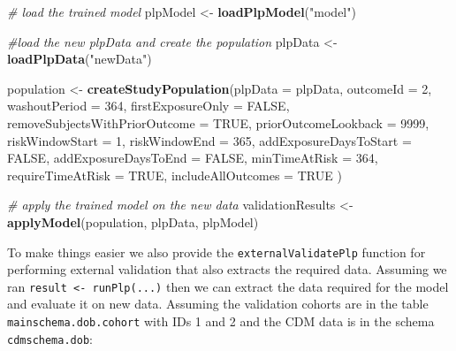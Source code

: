 \documentclass[11pt]{book}
\newenvironment{Shaded}{\begin{snugshade}}{\end{snugshade}}
\newcommand{\KeywordTok}[1]{\textcolor[rgb]{0.13,0.29,0.53}{\textbf{#1}}}
\newcommand{\DataTypeTok}[1]{\textcolor[rgb]{0.13,0.29,0.53}{#1}}
\newcommand{\DecValTok}[1]{\textcolor[rgb]{0.00,0.00,0.81}{#1}}
\newcommand{\StringTok}[1]{\textcolor[rgb]{0.31,0.60,0.02}{#1}}
\newcommand{\CommentTok}[1]{\textcolor[rgb]{0.56,0.35,0.01}{\textit{#1}}}
\newcommand{\OtherTok}[1]{\textcolor[rgb]{0.56,0.35,0.01}{#1}}
\newcommand{\NormalTok}[1]{#1}
\theoremstyle{definition}
\theoremstyle{definition}
\theoremstyle{definition}
\theoremstyle{remark}
\begin{document}
\begin{Shaded}
\begin{Highlighting}[]
\CommentTok{# load the trained model}
\NormalTok{plpModel <-}\StringTok{ }\KeywordTok{loadPlpModel}\NormalTok{(}\StringTok{"model"}\NormalTok{)}

\CommentTok{#load the new plpData and create the population}
\NormalTok{plpData <-}\StringTok{ }\KeywordTok{loadPlpData}\NormalTok{(}\StringTok{"newData"}\NormalTok{)}

\NormalTok{population <-}\StringTok{ }\KeywordTok{createStudyPopulation}\NormalTok{(}\DataTypeTok{plpData =}\NormalTok{ plpData,}
                                    \DataTypeTok{outcomeId =} \DecValTok{2}\NormalTok{,}
                                    \DataTypeTok{washoutPeriod =} \DecValTok{364}\NormalTok{,}
                                    \DataTypeTok{firstExposureOnly =} \OtherTok{FALSE}\NormalTok{,}
                                    \DataTypeTok{removeSubjectsWithPriorOutcome =} \OtherTok{TRUE}\NormalTok{,}
                                    \DataTypeTok{priorOutcomeLookback =} \DecValTok{9999}\NormalTok{,}
                                    \DataTypeTok{riskWindowStart =} \DecValTok{1}\NormalTok{,}
                                    \DataTypeTok{riskWindowEnd =} \DecValTok{365}\NormalTok{,}
                                    \DataTypeTok{addExposureDaysToStart =} \OtherTok{FALSE}\NormalTok{,}
                                    \DataTypeTok{addExposureDaysToEnd =} \OtherTok{FALSE}\NormalTok{,}
                                    \DataTypeTok{minTimeAtRisk =} \DecValTok{364}\NormalTok{,}
                                    \DataTypeTok{requireTimeAtRisk =} \OtherTok{TRUE}\NormalTok{,}
                                    \DataTypeTok{includeAllOutcomes =} \OtherTok{TRUE}
\NormalTok{)}

\CommentTok{# apply the trained model on the new data}
\NormalTok{validationResults <-}\StringTok{ }\KeywordTok{applyModel}\NormalTok{(population, plpData, plpModel)}
\end{Highlighting}
\end{Shaded}

To make things easier we also provide the \texttt{externalValidatePlp}
function for performing external validation that also extracts the
required data. Assuming we ran
\texttt{result\ \textless{}-\ runPlp(...)} then we can extract the data
required for the model and evaluate it on new data. Assuming the
validation cohorts are in the table \texttt{mainschema.dob.cohort} with
IDs 1 and 2 and the CDM data is in the schema \texttt{cdmschema.dob}:
\end{document}

